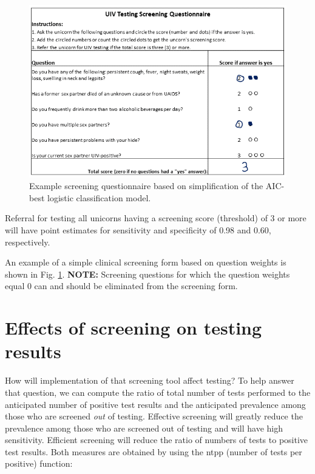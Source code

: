 \documentclass[11pt]{report}\usepackage[]{graphicx}\usepackage[]{xcolor}
\begin{document}
\begin{figure}[hp]
  \begin{center}
    \includegraphics[clip=true,width=1.0\textwidth]{UniTool}
    \caption{Example screening questionnaire based on simplification
      of the AIC-best logistic classification model.}
    \label{fig:f5}
\end{center}
\end{figure}
Referral for testing all unicorns having a screening score (threshold)
of 3 or more will have point estimates for sensitivity and specificity
of 0.98 and 0.60, respectively.

An example of a simple clinical
screening form based on question weights is shown in
Fig. \ref{fig:f5}. \textbf{NOTE:} Screening questions for which the
question weights equal 0 can and should be eliminated from the
screening form.

\section*{Effects of screening on testing results}

How will implementation of that screening tool affect testing? To help
answer that question, we can compute the ratio of total number of
tests performed to the anticipated number of positive test results and
the anticipated prevalence among those who are screened \emph{out} of
testing.  Effective screening will greatly
reduce the prevalence among those who are screened out of testing and
will have high sensitivity. Efficient screening will reduce the ratio of numbers of
tests to positive test results.
Both measures are obtained by using the \textsf{ntpp} (number of tests per
positive) function:
\end{document}
